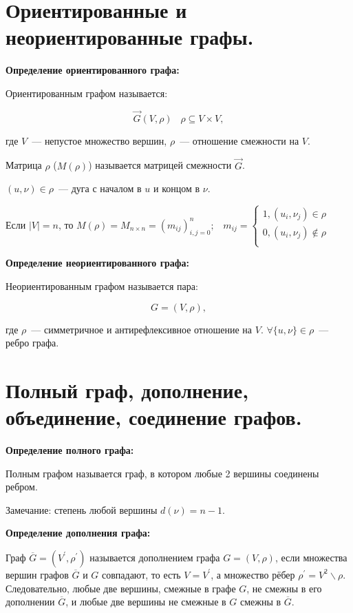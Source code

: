 \section{Ориентированные и неориентированные графы.}

\textbf{Определение ориентированного графа:}
    \smallskip

    Ориентированным графом называется:

    \[
        \overrightarrow{G}(V, \rho) \;\;\; \rho \subseteq V \times V,
    \]

    где $V$~--- непустое множество вершин, $\rho$~--- отношение смежности на $V$.
    \smallskip

    Матрица $\rho$ ($M(\rho)$) называется матрицей смежности $\overrightarrow{G}$.

    $(u, \nu) \in \rho$~--- дуга с началом в $u$ и концом в $\nu$.

    Если $|V| = n$, то $M(\rho) = M_{n \times n} = (m_{ij})^n_{i, j = 0}; \;\;\;
    m_{ij} = 
    \begin{cases}
        1, (u_i, \nu_j) \in \rho\\
        0, (u_i, \nu_j) \notin \rho\\
    \end{cases}$
    \bigskip

\textbf{Определение неориентированного графа:}
    \smallskip

    Неориентированным графом называется пара:

    \[
        G = (V, \rho),  
    \]

    где $\rho$~--- симметричное и антирефлексивное отношение на $V$. $\forall
    \{u, \nu\} \in \rho$~--- ребро графа.

\section{Полный граф, дополнение, объединение, соединение графов.}

\textbf{Определение полного графа:}
    \smallskip

    Полным графом называется граф, в котором любые 2 вершины соединены
    ребром.
    \smallskip

    Замечание: степень любой вершины $d(\nu) = n - 1$.
    \bigskip

\textbf{Определение дополнения графа:}
    \smallskip
    
    Граф $\overline{G} = (V^{'}, \rho^{'})$ называется дополнением графа
    $G = (V, \rho)$, если  множества вершин графов $\overline{G}$ и $G$ совпадают,
    то есть $V = V^{'}$,  а множество рёбер $\rho^{'} = V^2 \backslash \rho$.
    Следовательно, любые две вершины, смежные в графе $G$, не смежны в его дополнении
    $\overline{G}$, и любые две вершины не смежные в $G$ смежны в $\overline{G}$.

